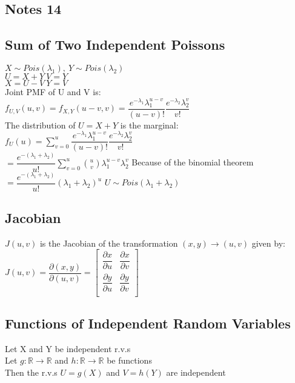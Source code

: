 \documentclass{article}
\begin{document}
\begin{flushleft}
\section*{Notes 14}
\subsection*{Sum of Two Independent Poissons}
$X\sim Pois(\lambda_1), \ Y\sim Pois(\lambda_2)$\\
$U=X+Y \ V=Y$\\
$X=U-V \ Y=V$\\
Joint PMF of U and V is:\\
$f_{U,V}(u,v)=f_{X,Y}(u-v,v)=\dfrac{e^{-\lambda_1}\lambda_1^{u-v}}{(u-v)!}\dfrac{e^{-\lambda_2}\lambda_2^v}{v!}$\\
The distribution of $U=X+Y$ is the marginal:\\
$f_U(u)=\sum_{v=0}^{u}\dfrac{e^{-\lambda_1}\lambda_1^{u-v}}{(u-v)!}\dfrac{e^{-\lambda_2}\lambda_2^v}{v!}$\\
$=\dfrac{e^{-(\lambda_1+\lambda_2)}}{u!}\sum_{v=0}^{u} {u \choose v}\lambda_1^{u-v}\lambda_2^v$\medbreak
Because of the binomial theorem\medbreak
$=\dfrac{e^{-(\lambda_1+\lambda_2)}}{u!}(\lambda_1+\lambda_2)^u$\medbreak
$U\sim Pois(\lambda_1+\lambda_2)$
\subsection*{Jacobian}
$J(u,v)$ is the Jacobian of the transformation $(x,y)\to (u,v)$ given by:\medbreak
$J(u,v)=\dfrac{\partial(x,y)}{\partial(u,v)}=
\begin{bmatrix}
\dfrac{\partial x}{\partial u}& \dfrac{\partial x}{\partial v}\\
\dfrac{\partial y}{\partial u}& \dfrac{\partial y}{\partial v}\\
\end{bmatrix}$
\subsection*{Functions of Independent Random Variables}
Let X and Y be independent r.v.s\\
Let $g:\mathbb{R}\to \mathbb{R}$ and $h:\mathbb{R}\to \mathbb{R}$ be functions\\
Then the r.v.s $U=g(X)$ and $V=h(Y)$ are independent

\end{flushleft}
\end{document}
